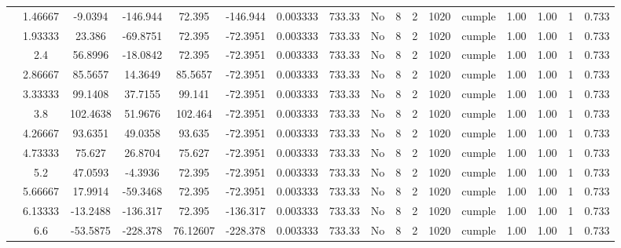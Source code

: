 \begin{table}[H]
{\begin{tabular}{|c|c|c|c|c|c|c|c|c|c|c|c|c|c|c|c|c|}
\cline{2-17}    & 1.46667 & -9.0394 & -146.944 & 72.395 & -146.944 & 0.003333 & 733.33 & No  & 8   & 2   & 1020 & \cellcolor[rgb]{ .776,  .937,  .808}cumple & 1.00 & 1.00 & 1   & 0.733 \bigstrut\\
\cline{2-17}    & 1.93333 & 23.386 & -69.8751 & 72.395 & -72.3951 & 0.003333 & 733.33 & No  & 8   & 2   & 1020 & \cellcolor[rgb]{ .776,  .937,  .808}cumple & 1.00 & 1.00 & 1   & 0.733 \bigstrut\\
\cline{2-17}    & 2.4 & 56.8996 & -18.0842 & 72.395 & -72.3951 & 0.003333 & 733.33 & No  & 8   & 2   & 1020 & \cellcolor[rgb]{ .776,  .937,  .808}cumple & 1.00 & 1.00 & 1   & 0.733 \bigstrut\\
\cline{2-17}    & 2.86667 & 85.5657 & 14.3649 & 85.5657 & -72.3951 & 0.003333 & 733.33 & No  & 8   & 2   & 1020 & \cellcolor[rgb]{ .776,  .937,  .808}cumple & 1.00 & 1.00 & 1   & 0.733 \bigstrut\\
\cline{2-17}    & 3.33333 & 99.1408 & 37.7155 & 99.141 & -72.3951 & 0.003333 & 733.33 & No  & 8   & 2   & 1020 & \cellcolor[rgb]{ .776,  .937,  .808}cumple & 1.00 & 1.00 & 1   & 0.733 \bigstrut\\
\cline{2-17}    & 3.8 & 102.4638 & 51.9676 & 102.464 & -72.3951 & 0.003333 & 733.33 & No  & 8   & 2   & 1020 & \cellcolor[rgb]{ .776,  .937,  .808}cumple & 1.00 & 1.00 & 1   & 0.733 \bigstrut\\
\cline{2-17}    & 4.26667 & 93.6351 & 49.0358 & 93.635 & -72.3951 & 0.003333 & 733.33 & No  & 8   & 2   & 1020 & \cellcolor[rgb]{ .776,  .937,  .808}cumple & 1.00 & 1.00 & 1   & 0.733 \bigstrut\\
\cline{2-17}    & 4.73333 & 75.627 & 26.8704 & 75.627 & -72.3951 & 0.003333 & 733.33 & No  & 8   & 2   & 1020 & \cellcolor[rgb]{ .776,  .937,  .808}cumple & 1.00 & 1.00 & 1   & 0.733 \bigstrut\\
\cline{2-17}    & 5.2 & 47.0593 & -4.3936 & 72.395 & -72.3951 & 0.003333 & 733.33 & No  & 8   & 2   & 1020 & \cellcolor[rgb]{ .776,  .937,  .808}cumple & 1.00 & 1.00 & 1   & 0.733 \bigstrut\\
\cline{2-17}    & 5.66667 & 17.9914 & -59.3468 & 72.395 & -72.3951 & 0.003333 & 733.33 & No  & 8   & 2   & 1020 & \cellcolor[rgb]{ .776,  .937,  .808}cumple & 1.00 & 1.00 & 1   & 0.733 \bigstrut\\
\cline{2-17}    & 6.13333 & -13.2488 & -136.317 & 72.395 & -136.317 & 0.003333 & 733.33 & No  & 8   & 2   & 1020 & \cellcolor[rgb]{ .776,  .937,  .808}cumple & 1.00 & 1.00 & 1   & 0.733 \bigstrut\\
\cline{2-17}    & 6.6 & -53.5875 & -228.378 & 76.12607 & -228.378 & 0.003333 & 733.33 & No  & 8   & 2   & 1020 & \cellcolor[rgb]{ .776,  .937,  .808}cumple & 1.00 & 1.00 & 1   & 0.733 \bigstrut\\

\end{tabular}}
\end{table}
